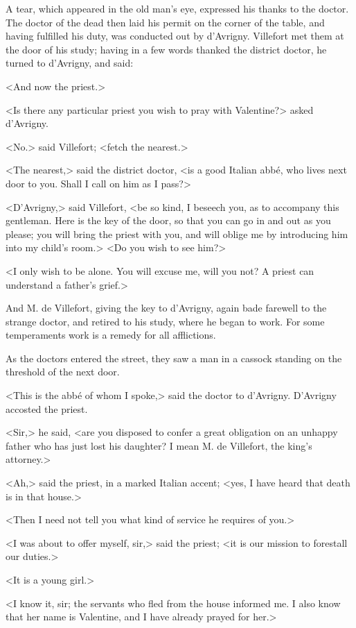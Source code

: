  A tear, which appeared in the old man's eye, expressed his thanks to the doctor. The doctor of the dead then laid his permit on the corner of the table, and having fulfilled his duty, was conducted out by d'Avrigny. Villefort met them at the door of his study; having in a few words thanked the district doctor, he turned to d'Avrigny, and said: 

 <And now the priest.> 

 <Is there any particular priest you wish to pray with Valentine?> asked d'Avrigny. 

 <No.> said Villefort; <fetch the nearest.> 

 <The nearest,> said the district doctor, <is a good Italian abbé, who lives next door to you. Shall I call on him as I pass?> 

 <D'Avrigny,> said Villefort, <be so kind, I beseech you, as to accompany this gentleman. Here is the key of the door, so that you can go in and out as you please; you will bring the priest with you, and will oblige me by introducing him into my child's room.>  <Do you wish to see him?> 

 <I only wish to be alone. You will excuse me, will you not? A priest can understand a father's grief.> 

 And M. de Villefort, giving the key to d'Avrigny, again bade farewell to the strange doctor, and retired to his study, where he began to work. For some temperaments work is a remedy for all afflictions. 

 As the doctors entered the street, they saw a man in a cassock standing on the threshold of the next door. 

 <This is the abbé of whom I spoke,> said the doctor to d'Avrigny. D'Avrigny accosted the priest. 

 <Sir,> he said, <are you disposed to confer a great obligation on an unhappy father who has just lost his daughter? I mean M. de Villefort, the king's attorney.> 

 <Ah,> said the priest, in a marked Italian accent; <yes, I have heard that death is in that house.> 

 <Then I need not tell you what kind of service he requires of you.> 

 <I was about to offer myself, sir,> said the priest; <it is our mission to forestall our duties.> 

 <It is a young girl.> 

 <I know it, sir; the servants who fled from the house informed me. I also know that her name is Valentine, and I have already prayed for her.> 

